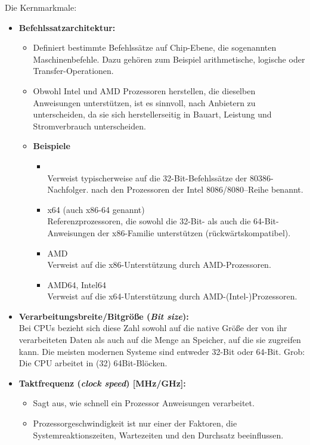 Die Kernmarkmale:
\begin{itemize}
	\item \textbf{Befehlssatzarchitektur:}
\begin{itemize}
	\item 	Definiert bestimmte Befehlssätze auf Chip-Ebene, die sogenannten Maschinenbefehle. Dazu gehören zum Beispiel arithmetische, logische oder Transfer-Operationen.
	\item Obwohl Intel und AMD Prozessoren herstellen, die dieselben Anweisungen unterstützen, ist es sinnvoll, nach Anbietern zu unterscheiden, da sie sich herstellerseitig in Bauart, Leistung und Stromverbrauch unterscheiden.
	\item \textbf{Beispiele}
	\begin{itemize}
		\item {}		\\
		Verweist typischerweise auf die 32-Bit-Befehlssätze der 80386-Nachfolger. nach den Prozessoren der Intel 8086/8080--Reihe benannt.
		\item	x64 (auch x86-64 genannt)\\
		Referenzprozessoren, die sowohl die 32-Bit- als auch die 64-Bit-Anweisungen der x86-Familie unterstützen (rückwärtskompatibel).
		\item	AMD	\\
		Verweist auf die x86-Unterstützung durch AMD-Prozessoren.
		\item	AMD64, Intel64	\\
		Verweist auf die x64-Unterstützung durch AMD-(Intel-)Prozessoren.
	\end{itemize}
\end{itemize}
	\item \textbf{Verarbeitungsbreite/Bitgröße (\textit{Bit size}):}\\
	Bei CPUs bezieht sich diese Zahl sowohl auf die native Größe der von ihr verarbeiteten Daten als auch auf die Menge an Speicher, auf die sie zugreifen kann. Die meisten modernen Systeme sind entweder 32-Bit oder 64-Bit. Grob: Die CPU arbeitet in (32) 64Bit-Blöcken.
	\item \textbf{Taktfrequenz (\textit{clock speed}) [MHz/GHz]:}
\begin{itemize}
	\item Sagt aus, wie schnell ein Prozessor Anweisungen verarbeitet. \item Prozessorgeschwindigkeit ist nur einer der Faktoren, die Systemreaktionszeiten, Wartezeiten und den Durchsatz beeinflussen.

\end{itemize}
\end{itemize}
